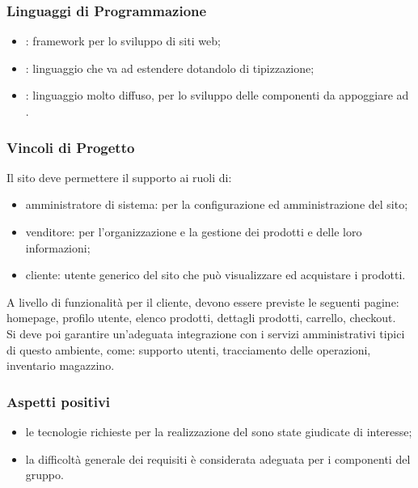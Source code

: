 \documentclass[]{article}
\begin{document}
			\subsubsection{Linguaggi di Programmazione}
			\begin{itemize}
				\item \textsc{:} framework per lo sviluppo  di siti web;
				\item \textsc{:} linguaggio che va ad estendere  dotandolo di tipizzazione;
				\item \textsc{:} linguaggio molto diffuso, per lo sviluppo delle componenti  da appoggiare ad .
			\end{itemize}
			

			\subsubsection{Vincoli di Progetto}
			Il sito deve permettere il supporto ai ruoli di: 
			\begin{itemize}
			    \item amministratore di sistema: per la configurazione ed  amministrazione del sito;
			    \item venditore: per l'organizzazione e la gestione dei prodotti e delle loro informazioni;
			    \item cliente: utente generico del sito che può visualizzare ed acquistare i prodotti.
			\end{itemize}				
		A livello di funzionalità per il cliente, devono essere previste le seguenti pagine:  homepage, profilo utente, elenco prodotti, dettagli prodotti, carrello, checkout.\\
		Si deve poi garantire un'adeguata integrazione con i servizi amministrativi tipici di questo ambiente, come: supporto utenti, tracciamento delle operazioni, inventario magazzino.\\

			\subsubsection{Aspetti positivi}
			\begin{itemize}
				\item le tecnologie richieste per la realizzazione del  sono state giudicate di interesse;
				\item la difficoltà generale dei requisiti è considerata adeguata per i componenti del gruppo.
			\end{itemize}
\end{document}

